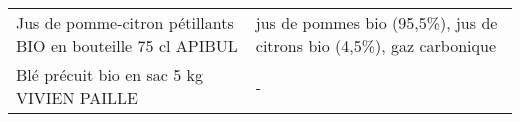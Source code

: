 \begin{longtable}{p{5cm}p{10cm}}
                                             Jus de pomme-citron pétillants BIO en bouteille 75 cl APIBUL &                                                                                                                                                                                                                                                                                                                                                                                                                                                                                                                                                                                                                                                                                                                                                                                                                                                                                                                                                                     jus de pommes bio (95,5\%), jus de citrons bio (4,5\%), gaz carbonique \\
                                                                Blé précuit bio en sac 5 kg VIVIEN PAILLE &                                                                                                                                                                                                                                                                                                                                                                                                                                                                                                                                                                                                                                                                                                                                                                                                                                                                                                                                                                                                                                        - \\

\end{longtable}
